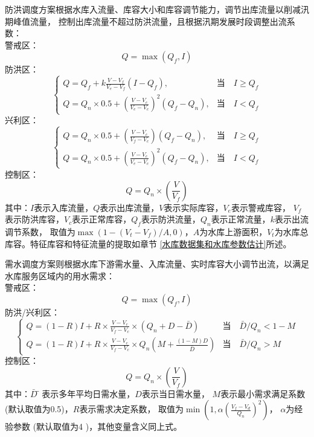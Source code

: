 防洪调度方案根据水库入流量、库容大小和库容调节能力，调节出库流量以削减汛期峰值流量，
控制出库流量不超过防洪流量，且根据汛期发展时段调整出流系数\citep{hanazaki2022development}：\\
警戒区：
\begin{equation}
Q=\max \left(Q_{f}, I\right)
\end{equation}
防洪区：
\begin{equation}
\left\{\begin{array}{ll}Q=Q_{f}+k \frac{V-V_{f}}{V_{e}-V_{f}}\left(I-Q_{f}\right), & \text{当}\quad I \geq Q_{f} \\
     Q=Q_{n} \times 0.5+\left(\frac{V-V_{c}}{V_{e}-V_{c}}\right)^{2}\left(Q_{f}-Q_{n}\right), & \text{当}\quad I<Q_{f}\end{array}\right.
\end{equation}
兴利区：
\begin{equation}
\left\{\begin{array}{ll}Q=Q_{n} \times 0.5+\left(\frac{V-V_{c}}{V_{f}-V_{c}}\right)\left(Q_{f}-Q_{n}\right), & \text{当}\quad I \geq Q_{f} \\
     Q=Q_{n} \times 0.5+\left(\frac{V-V_{c}}{V_{e}-V_{c}}\right)^{2}\left(Q_{f}-Q_{n}\right), & \text{当}\quad I<Q_{f}\end{array}\right.
\end{equation}
控制区：
\begin{equation}
Q=Q_{n} \times\left(\frac{V}{V_{f}}\right)
\end{equation}
其中：$I$表示入库流量，$Q$表示出库流量，$V$表示实际库容，$V_e$表示警戒库容，
$V_f$表示防洪库容，$V_c$表示正常库容，$Q_f$表示防洪流量，$Q_n$表示正常流量，$k$表示出流调节系数，
取值为$\max(1-(V_t-V_f)/A,0)$，$A$为水库上游面积，$V_t$为水库总库容。特征库容和特征流量的提取如章节 \ref{水库数据集和水库参数估计}所述。


需水调度方案则根据水库下游需水量、入库流量、实时库容大小调节出流，以满足水库服务区域内的用水需求\citep{hanasaki2006reservoir,shin2019high}：\\
警戒区：
\begin{equation}
Q=\max \left(Q_{f}, I\right)
\end{equation}
防洪/兴利区：
\begin{equation}
\left\{\begin{array}{ll}Q=(1-R) I+R \times \frac{V-V_{c}}{V_{f}-V_{c}} \times\left(Q_{n}+D-\bar{D}\right) & \text{当}\quad
    \bar{D} / Q_{n}<1-M \\ 
    Q=(1-R) I+R \times \frac{V-V_{c}}{V_{f}-V_{c}} \times Q_{n}\left(M+\frac{(1-M) D}{\bar{D}}\right)      &  \text{当}\quad
    \bar{D} / Q_{n}>M
    \end{array}\right.
\end{equation}
控制区：
\begin{equation}
Q=Q_{n} \times\left(\frac{V}{V_{f}}\right)
\end{equation}
其中：$\bar{D}̅$表示多年平均日需水量，$D$表示当日需水量，
$M$表示最小需求满足系数 (默认取值为0.5\citep{hanasaki2006reservoir})，$R$表示需求决定系数，
取值为$\min \left(1, \alpha\left(\frac{V_{f}-V_{d}}{Q_{n}}\right)^{2}\right)$，
$\alpha$为经验参数 (默认取值为4 \citep{hanasaki2006reservoir})，其他变量含义同上式。


